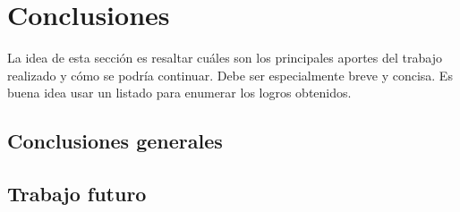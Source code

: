 
\chapter{Conclusiones} %

\label{Chapter5} %



La idea de esta sección es resaltar cuáles son los principales aportes del trabajo realizado y cómo se podría continuar. Debe ser especialmente breve y concisa. Es buena idea usar un listado para enumerar los logros obtenidos.

\section{Conclusiones generales}



\section{Trabajo futuro}
\label{sec:trabajo_futuro}
